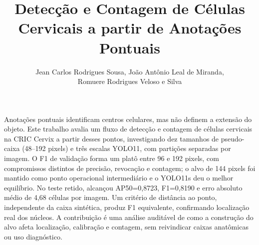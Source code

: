 \documentclass[12pt]{article}
\title{Detec\c{c}\~ao e Contagem de C\'elulas Cervicais a partir de Anota\c{c}\~oes Pontuais}
\author{Jean Carlos Rodrigues Sousa\inst{1}, Jo\~ao Ant\^onio Leal de Miranda\inst{1},\\
Romuere Rodrigues Veloso e Silva\inst{1}}
\begin{document}
\maketitle

\begin{resumo}
Anota\c{c}\~oes pontuais identificam centros celulares, mas n\~ao definem a
extens\~ao do objeto. Este trabalho avalia um fluxo de detec\c{c}\~ao e contagem
de c\'elulas cervicais na CRIC Cervix a partir desses pontos, investigando dez
tamanhos de pseudo-caixa (48--192 pixels) e tr\^es escalas YOLO11, com
parti\c{c}\~oes separadas por imagem. O F1 de valida\c{c}\~ao forma um plat\^o
entre 96 e 192 pixels, com compromissos distintos de precis\~ao, revoca\c{c}\~ao e
contagem; o alvo de 144 pixels foi mantido como ponto operacional intermedi\'ario
e o YOLO11s deu o melhor equil\'ibrio. No teste retido, alcan\c{c}ou AP50=0,8723,
F1=0,8190 e erro absoluto m\'edio de 4,68 c\'elulas por imagem. Um crit\'erio de
dist\^ancia ao ponto, independente da caixa sint\'etica, produz F1 equivalente,
confirmando localiza\c{c}\~ao real dos n\'ucleos. A contribui\c{c}\~ao \'e uma
an\'alise audit\'avel de como a constru\c{c}\~ao do alvo afeta localiza\c{c}\~ao,
calibra\c{c}\~ao e contagem, sem reivindicar caixas anat\^omicas ou uso
diagn\'ostico.
\end{resumo}









\end{document}
